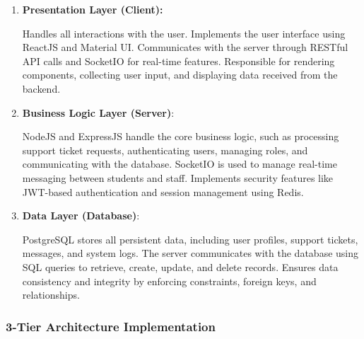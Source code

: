 	
	\begin{enumerate}
		\item \textbf{Presentation Layer (Client):}
		
		Handles all interactions with the user.
		Implements the user interface using ReactJS and Material UI.
		Communicates with the server through RESTful API calls and SocketIO for real-time features.
		Responsible for rendering components, collecting user input, and displaying data received from the backend.
		
		\item \textbf{Business Logic Layer (Server)}:
		
		NodeJS and ExpressJS handle the core business logic, such as processing support ticket requests, authenticating users, managing roles, and communicating with the database.
		SocketIO is used to manage real-time messaging between students and staff.
		Implements security features like JWT-based authentication and session management using Redis.
		
		\item \textbf{ Data Layer (Database)}:
		
		PostgreSQL stores all persistent data, including user profiles, support tickets, messages, and system logs.
		The server communicates with the database using SQL queries to retrieve, create, update, and delete records.
		Ensures data consistency and integrity by enforcing constraints, foreign keys, and relationships.
		
	\end{enumerate}
	
	
	\subsubsection{3-Tier Architecture Implementation}
	
